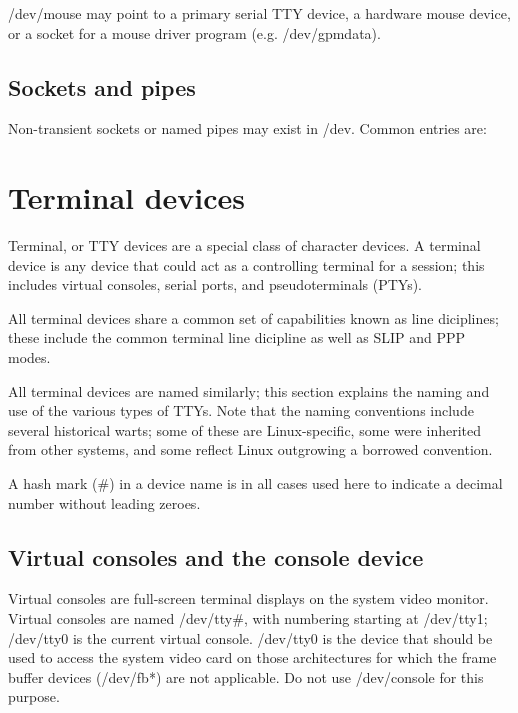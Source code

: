 {\file /dev/mouse} may point to a primary serial TTY device, a
hardware mouse device, or a socket for a mouse driver program
(e.g. {\file /dev/gpmdata}).

\subsection{Sockets and pipes}

Non-transient sockets or named pipes may exist in {\file /dev}.
Common entries are:

\begin{nodelist}
\end{nodelist}

\section{Terminal devices}

Terminal, or TTY devices are a special class of character devices.  A
terminal device is any device that could act as a controlling terminal
for a session; this includes virtual consoles, serial ports, and
pseudoterminals (PTYs).

All terminal devices share a common set of capabilities known as line
diciplines; these include the common terminal line dicipline as well
as SLIP and PPP modes.

All terminal devices are named similarly; this section explains the
naming and use of the various types of TTYs.  Note that the naming
conventions include several historical warts; some of these are
Linux-specific, some were inherited from other systems, and some
reflect Linux outgrowing a borrowed convention.

A hash mark ($\#$) in a device name is in all cases used here to
indicate a decimal number without leading zeroes.

\subsection{Virtual consoles and the console device}

Virtual consoles are full-screen terminal displays on the system video
monitor.  Virtual consoles are named {\file /dev/tty$\#$}, with
numbering starting at {\file /dev/tty1}; {\file /dev/tty0} is the
current virtual console.  {\file /dev/tty0} is the device that should
be used to access the system video card on those architectures for
which the frame buffer devices ({\file /dev/fb*}) are not applicable.
Do not use {\file /dev/console} for this purpose.

